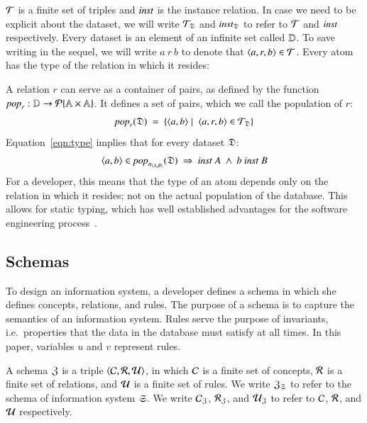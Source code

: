 \documentclass{elsarticle}
\begin{document}
   $\mathcal{T}$ is a finite set of triples and $\text{\it inst\/}$ is the instance relation.
   In case we need to be explicit about the dataset,
   we will write $\mathcal{T}_{\mathfrak{D}}$ and $\text{\it inst\/}_{\mathfrak{D}}$ to refer to $\mathcal{T}$ and $\text{\it inst\/}$ respectively.
   Every dataset is an element of an infinite set called $\mathbb{D}$.
   To save writing in the sequel, we will write $a\ r\ b$ to denote that $\langle{a},{r},{b}\rangle\in\mathcal{T}$.
   Every atom has the type of the relation in which it resides:

   A relation $r$ can serve as a container of pairs,
   as defined by the function $\text{\it pop\/}_r:\mathbb{D}\rightarrow\cal{P}\{\mathbb{A}\times\mathbb{A}\}$.
   It defines a set of pairs, which we call the population of $r$:
\begin{equation}
   \pop{r}{\dataset}\ =\ \{ \pair{a}{b}\mid\ \triple{a}{r}{b}\in\triples_{\dataset}\}
\label{eqn:pop}
\end{equation}
   Equation~\ref{eqn:type} implies that for every dataset $\mathfrak{D}$:
\[\pair{a}{b}\in\pop{\declare{n}{A}{B}}{\dataset}\ \Rightarrow\ \inst\ A\ \wedge\ b\ \inst\ B\]
   For a developer, this means that the type of an atom depends only on the relation in which it resides; not on the actual population of the database.
   This allows for static typing, which has well established advantages for the software engineering process~\cite{HanenbergKRTS14,Petersen2014}.

\subsection{Schemas}
\label{sct:Schemas}
   To design an information system, a developer defines a schema in which she defines concepts, relations, and rules.
   The purpose of a schema is to capture the semantics of an information system.
   Rules serve the purpose of invariants,
   i.e.\ properties that the data in the database must satisfy at all times.
   In this paper, variables $u$ and $v$ represent rules.

   A schema $\mathfrak{Z}$ is a triple $\langle{\mathcal{C}},{\mathcal{R}},{\mathcal{U}}\rangle$,
   in which $\mathcal{C}$ is a finite set of concepts,
   $\mathcal{R}$ is a finite set of relations,
   and $\mathcal{U}$ is a finite set of rules.
   We write $\mathfrak{Z}_{\mathfrak{S}}$ to refer to the schema of information system $\mathfrak{S}$.
   We write $\mathcal{C}_{\mathfrak{Z}}$, $\mathcal{R}_{\mathfrak{Z}}$, and $\mathcal{U}_{\mathfrak{Z}}$ to refer to $\mathcal{C}$, $\mathcal{R}$, and $\mathcal{U}$ respectively.
\end{document}
